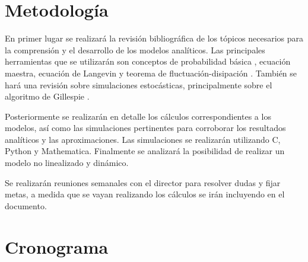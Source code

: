 \documentclass[12pt]{article}
\begin{document}
\section{Metodolog\'ia}

En primer lugar se realizar\'a la revisi\'on bibliogr\'afica de los t\'opicos necesarios para la comprensi\'on y el desarrollo de los modelos anal\'iticos. Las principales herramientas que se utilizar\'an son conceptos de probabilidad b\'asica \cite{bertsekas08}, ecuaci\'on maestra, ecuaci\'on de Langevin y teorema de fluctuaci\'on-disipaci\'on \cite{vankampen92} \cite{gardiner03}. Tambi\'en se har\'a una revisi\'on sobre simulaciones estoc\'asticas, principalmente sobre el algoritmo de Gillespie \cite{gillespie77}.

Posteriormente se realizar\'an en detalle los c\'alculos correspondientes a los modelos, as\'i como las simulaciones pertinentes para corroborar los resultados anal\'iticos y las aproximaciones. Las simulaciones se realizar\'an utilizando C, Python y Mathematica. Finalmente se analizar\'a la posibilidad de realizar un modelo no linealizado y din\'amico.

Se realizar\'an reuniones semanales con el director para resolver dudas y fijar metas, a medida que se vayan realizando los c\'alculos se ir\'an incluyendo en el documento.

\section{Cronograma}
\end{document}
